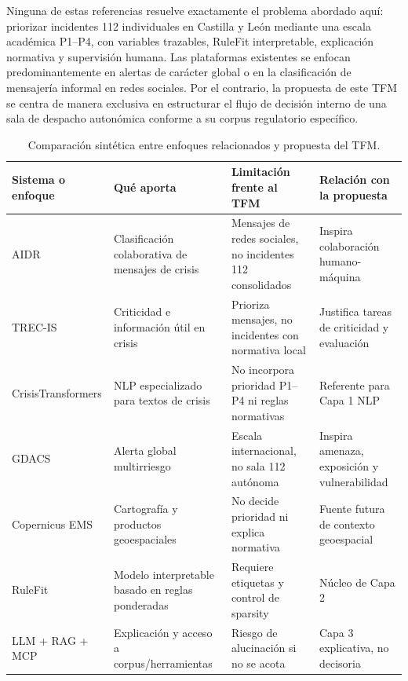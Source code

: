 Ninguna de estas referencias resuelve exactamente el problema abordado aquí: priorizar incidentes 112 individuales en Castilla y León mediante una escala académica P1--P4, con variables trazables, RuleFit interpretable, explicación normativa y supervisión humana. Las plataformas existentes se enfocan predominantemente en alertas de carácter global o en la clasificación de mensajería informal en redes sociales. Por el contrario, la propuesta de este TFM se centra de manera exclusiva en estructurar el flujo de decisión interno de una sala de despacho autonómica conforme a su corpus regulatorio específico.

\begin{table}[htbp]
\centering
\scriptsize
\setlength{\tabcolsep}{3pt}
\begin{tabular}{|p{2.6cm}|p{3.3cm}|p{3.5cm}|p{3.5cm}|}
\hline
\textbf{Sistema o enfoque} & \textbf{Qué aporta} & \textbf{Limitación frente al TFM} & \textbf{Relación con la propuesta} \\ \hline
AIDR & Clasificación colaborativa de mensajes de crisis & Mensajes de redes sociales, no incidentes 112 consolidados & Inspira colaboración humano-máquina \\ \hline
TREC-IS & Criticidad e información útil en crisis & Prioriza mensajes, no incidentes con normativa local & Justifica tareas de criticidad y evaluación \\ \hline
CrisisTransformers & NLP especializado para textos de crisis & No incorpora prioridad P1--P4 ni reglas normativas & Referente para Capa 1 NLP \\ \hline
GDACS & Alerta global multirriesgo & Escala internacional, no sala 112 autónoma & Inspira amenaza, exposición y vulnerabilidad \\ \hline
Copernicus EMS & Cartografía y productos geoespaciales & No decide prioridad ni explica normativa & Fuente futura de contexto geoespacial \\ \hline
RuleFit & Modelo interpretable basado en reglas ponderadas & Requiere etiquetas y control de sparsity & Núcleo de Capa 2 \\ \hline
LLM + RAG + MCP & Explicación y acceso a corpus/herramientas & Riesgo de alucinación si no se acota & Capa 3 explicativa, no decisoria \\ \hline
\end{tabular}
\caption{Comparación sintética entre enfoques relacionados y propuesta del TFM.}
\label{tab:comparacion-sistemas-existentes}
\end{table}

